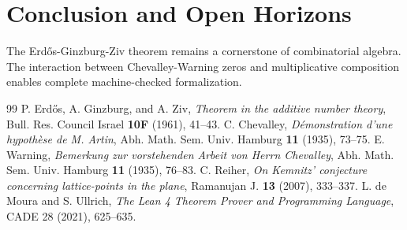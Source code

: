 \documentclass[11pt,a4paper]{article}
\theoremstyle{definition}
\begin{document}
\section{Conclusion and Open Horizons}
The Erd\H{o}s-Ginzburg-Ziv theorem remains a cornerstone of combinatorial algebra. The interaction between Chevalley-Warning zeros and multiplicative composition enables complete machine-checked formalization.

\begin{thebibliography}{99}
 P. Erd\H{o}s, A. Ginzburg, and A. Ziv, \textit{Theorem in the additive number theory}, Bull. Res. Council Israel \textbf{10F} (1961), 41--43.
 C. Chevalley, \textit{D\'emonstration d'une hypoth\`ese de M. Artin}, Abh. Math. Sem. Univ. Hamburg \textbf{11} (1935), 73--75.
 E. Warning, \textit{Bemerkung zur vorstehenden Arbeit von Herrn Chevalley}, Abh. Math. Sem. Univ. Hamburg \textbf{11} (1935), 76--83.
 C. Reiher, \textit{On Kemnitz' conjecture concerning lattice-points in the plane}, Ramanujan J. \textbf{13} (2007), 333--337.
 L. de Moura and S. Ullrich, \textit{The Lean 4 Theorem Prover and Programming Language}, CADE 28 (2021), 625--635.
\end{thebibliography}
\end{document}
